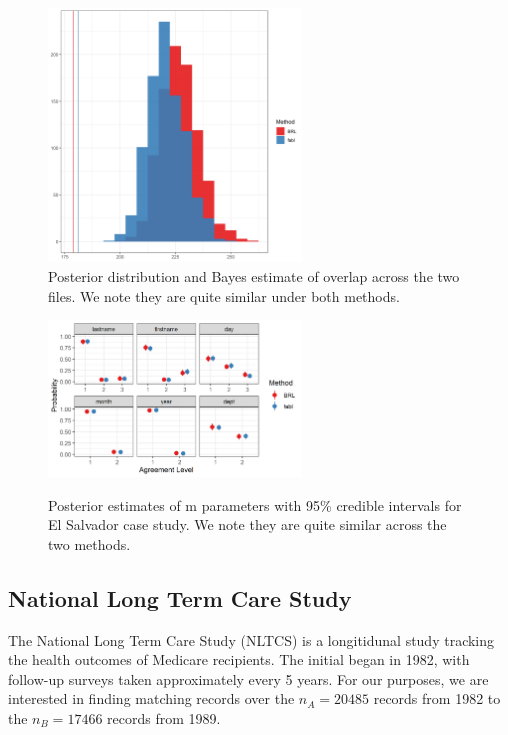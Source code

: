 \documentclass[ba]{imsart}
\begin{document}
\begin{figure}[t]
	\begin{center}
		\includegraphics[width=0.6\textwidth]{../notes/figures/el_salvador/overlap_distribution_smallP_bayes}
		\caption{Posterior distribution and Bayes estimate of overlap across the two files. We note they are quite similar under both methods.}
		\label{fig:overlap-plot}
	\end{center}
\end{figure}


\begin{figure}[t]
\begin{center}
	\includegraphics[width=0.6\textwidth]{../notes/figures/el_salvador/m_posterior_smallP} 
\caption{Posterior estimates of m parameters with 95\% credible intervals for El Salvador case study. We note they are quite similar across the two methods.}\label{fig:m-and-u}
\label{fig:m-and-u}
\end{center}
\end{figure}

\subsection{National Long Term Care Study}
\label{nltcs}

The National Long Term Care Study (NLTCS) is a longitidunal study tracking the health outcomes of Medicare recipients. The initial began in 1982, with follow-up surveys taken approximately every 5 years. For our purposes, we are interested in finding matching records over the $n_A = 20485$ records from 1982 to the $n_B = 17466$ records from 1989. 
\end{document}
